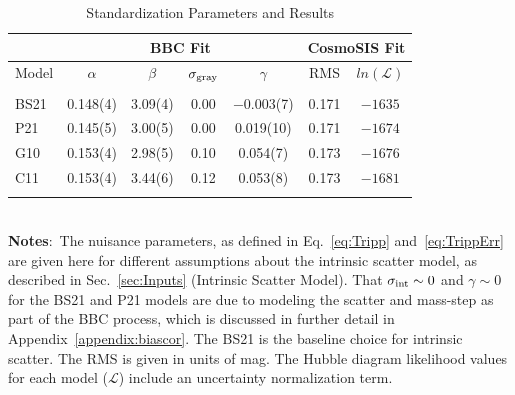 
\begin{table}
\vspace{3mm}
\caption{Standardization Parameters and Results}
\centering

\begin{tabular}{lcccccc}
\toprule
 \multicolumn{1}{|c}{}& \multicolumn{4}{|c|}{BBC Fit} & \multicolumn{2}{c|}{CosmoSIS Fit}\\ 
\hline
 Model & $\alpha$ & $\beta$ & $\sigma_{\rm gray}$ & $\gamma$ & RMS & $ln(\mathcal{L})$\\ 
\hline
\vspace{-.2cm}
\\

BS21 & 0.148(4)& 3.09(4) & 0.00 & $-0.003$(7) & 0.171 & $-1635$\\
P21 & 0.145(5) & 3.00(5) & 0.00 & 0.019(10) & 0.171 & $-1674$\\
G10 & 0.153(4) & 2.98(5) & 0.10 & 0.054(7) & 0.173 & $-1676$ \\
C11 & 0.153(4) & 3.44(6) & 0.12 & 0.053(8) & 0.173 & $-1681$ \\


    
\hline
\label{tab:nuisance}


\end{tabular}
{\raggedright
\ \\
\textbf{Notes}:~The nuisance parameters, as defined in Eq.~\ref{eq:Tripp} and~\ref{eq:TrippErr} are given here for different assumptions about the intrinsic scatter model, as described in Sec.~\ref{sec:Inputs} (Intrinsic Scatter Model).  That $\sigma_{\rm int}\sim0$ and $\gamma\sim0$ for the BS21 and P21 models are due to modeling the scatter and mass-step as part of the BBC process, which is discussed in further detail in Appendix~\ref{appendix:biascor}.  The BS21 is the baseline choice for intrinsic scatter.  The RMS is given in units of mag. The Hubble diagram likelihood values for each model ($\mathcal{L}$) include an uncertainty normalization term.\\}
\end{table}

